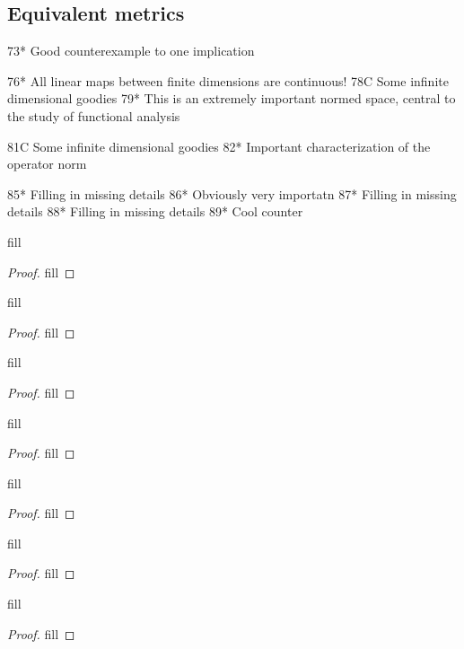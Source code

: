 \subsection{Equivalent metrics}

73* Good counterexample to one implication

76* All linear maps between finite dimensions are continuous!
78C Some infinite dimensional goodies 
79* This is an extremely important normed space, central to the study of functional analysis 

81C Some infinite dimensional goodies 
82* Important characterization of the operator norm

85* Filling in missing details 
86* Obviously very importatn
87* Filling in missing details
88* Filling in missing details 
89* Cool counter

\begin{exercise}{73}
fill
\end{exercise}
\begin{proof}
fill
\end{proof} 

\begin{exercise}{76}
fill
\end{exercise}
\begin{proof}
fill
\end{proof} 

\begin{exercise}{78}
fill
\end{exercise}
\begin{proof}
fill
\end{proof} 

\begin{exercise}{79}
fill
\end{exercise}
\begin{proof}
fill
\end{proof} 

\begin{exercise}{81}
fill
\end{exercise}
\begin{proof}
fill
\end{proof} 

\begin{exercise}{82}
fill
\end{exercise}
\begin{proof}
fill
\end{proof} 

\begin{exercise}{85}
fill
\end{exercise}
\begin{proof}
fill
\end{proof} 

